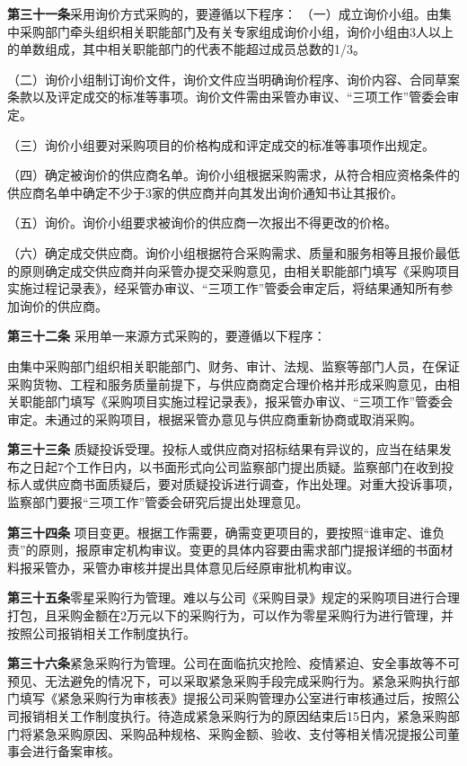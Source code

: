 \textbf{第三十一条}\quad  采用询价方式采购的，要遵循以下程序：
    （一）成立询价小组。由集中采购部门牵头组织相关职能部门及有关专家组成询价小组，询价小组由3人以上的单数组成，其中相关职能部门的代表不能超过成员总数的1/3。

（二）询价小组制订询价文件，询价文件应当明确询价程序、询价内容、合同草案条款以及评定成交的标准等事项。询价文件需由采管办审议、“三项工作”管委会审定。

（三）询价小组要对采购项目的价格构成和评定成交的标准等事项作出规定。

（四）确定被询价的供应商名单。询价小组根据采购需求，从符合相应资格条件的供应商名单中确定不少于3家的供应商并向其发出询价通知书让其报价。

（五）询价。询价小组要求被询价的供应商一次报出不得更改的价格。

（六）确定成交供应商。询价小组根据符合采购需求、质量和服务相等且报价最低的原则确定成交供应商并向采管办提交采购意见，由相关职能部门填写《采购项目实施过程记录表》，经采管办审议、“三项工作”管委会审定后，将结果通知所有参加询价的供应商。

\textbf{第三十二条} \quad 采用单一来源方式采购的，要遵循以下程序：

由集中采购部门组织相关职能部门、财务、审计、法规、监察等部门人员，在保证采购货物、工程和服务质量前提下，与供应商商定合理价格并形成采购意见，由相关职能部门填写《采购项目实施过程记录表》，报采管办审议、“三项工作”管委会审定。未通过的采购项目，根据采管办意见与供应商重新协商或取消采购。

\textbf{第三十三条} \quad 质疑投诉受理。投标人或供应商对招标结果有异议的，应当在结果发布之日起7个工作日内，以书面形式向公司监察部门提出质疑。监察部门在收到投标人或供应商书面质疑后，要对质疑投诉进行调查，作出处理。对重大投诉事项，监察部门要报“三项工作”管委会研究后提出处理意见。

\textbf{第三十四条 }\quad 项目变更。根据工作需要，确需变更项目的，要按照“谁审定、谁负责”的原则，报原审定机构审议。变更的具体内容要由需求部门提报详细的书面材料报采管办，采管办审核并提出具体意见后经原审批机构审议。

\textbf{第三十五条}\quad  零星采购行为管理。难以与公司《采购目录》规定的采购项目进行合理打包，且采购金额在2万元以下的采购行为，可以作为零星采购行为进行管理，并按照公司报销相关工作制度执行。

\textbf{第三十六条}\quad  紧急采购行为管理。公司在面临抗灾抢险、疫情紧迫、安全事故等不可预见、无法避免的情况下，可以采取紧急采购手段完成采购行为。紧急采购执行部门填写《紧急采购行为审核表》提报公司采购管理办公室进行审核通过后，按照公司报销相关工作制度执行。待造成紧急采购行为的原因结束后15日内，紧急采购部门将紧急采购原因、采购品种规格、采购金额、验收、支付等相关情况提报公司董事会进行备案审核。

